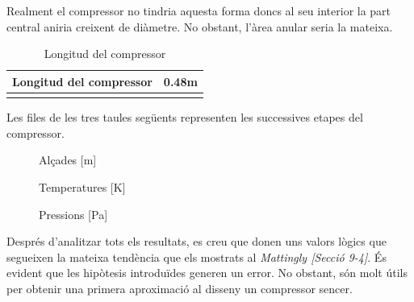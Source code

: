 Realment el compressor no tindria aquesta forma doncs al seu interior la part central aniria creixent de diàmetre. No obstant, l'àrea anular seria la mateixa.
\begin{longtable}[H]{C{5cm} C{2.5cm}}
	\toprule[2pt]
	Longitud del compressor &  \textbf{0.48m} \\ \bottomrule[2pt]
	\caption{Longitud del compressor}
	\label{aleps}
\end{longtable}
Les files de les tres taules següents representen les successives etapes del compressor.
\begin{figure}[H]
	\centering
	
	\caption{Alçades [m]}
\end{figure}
\begin{figure}[H]
	\centering
	
	\caption{Temperatures [K]}
\end{figure}
\begin{figure}[H]
	\centering
	
	\caption{Pressions [Pa]}
\end{figure}

Després d'analitzar tots els resultats, es creu que donen uns valors lògics que segueixen la mateixa tendència que els mostrats al \textit{Mattingly [Secció 9-4]}. És evident que les hipòtesis introduïdes generen un error. No obstant, són molt útils per obtenir una primera aproximació al disseny un compressor sencer.